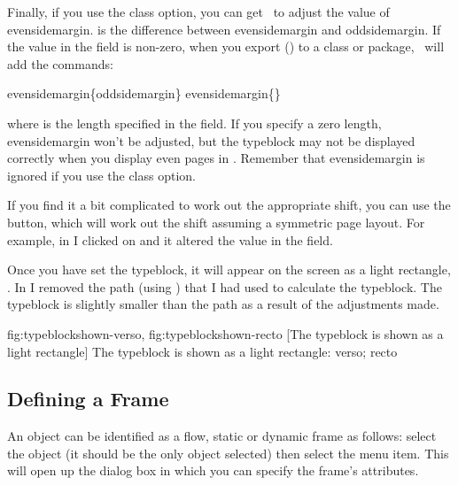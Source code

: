 Finally, if you use the  class option, you can get
\FlowframTk\ to adjust the value of \gls{evensidemargin}.
 is the difference between
\gls{evensidemargin} and \gls{oddsidemargin}. If the value
in the  field is non-zero, when you
export () to a class or package, 
\FlowframTk\ will add the commands:
\begin{compactcodebox}
\gls{evensidemargin}\{\gls{oddsidemargin}\}
\gls{evensidemargin}\{\}
\end{compactcodebox}%
where  is the length specified in the
 field. If you specify a zero
length, \gls{evensidemargin} won't be adjusted, but the
typeblock may not be displayed correctly when you display even
pages in \FlowframTk. Remember that \gls{evensidemargin} is
ignored if you use the  class option.


If you find it a bit complicated to work out the appropriate shift,
you can use the  button,
which will work out the shift assuming a symmetric page layout. For
example, in  I clicked on
 and it altered the
value in the  field.

Once you have set the \gls{typeblock}, it will appear on the screen as
a light  rectangle,  . In
 I removed the \gls{path} (using
) that I had used to calculate the \gls{typeblock}. The
\gls{typeblock} is slightly smaller than the \gls*{path} as a result of
the adjustments made.

{
 {fig:typeblockshown-verso}{}{},
 {fig:typeblockshown-recto}{}{}
}
[The typeblock is shown as a light  rectangle]
{The typeblock is shown as a light  rectangle:
 verso;
 recto}

\subsection{Defining a Frame}\label{sec:framedef}


An \gls{object} can be identified as a flow, static or
dynamic frame as follows: select the \gls{object} (it should
be the only \gls*{object} selected) then select the
 menu item.
This will open up the  dialog box in which you can specify the frame's
attributes. 

